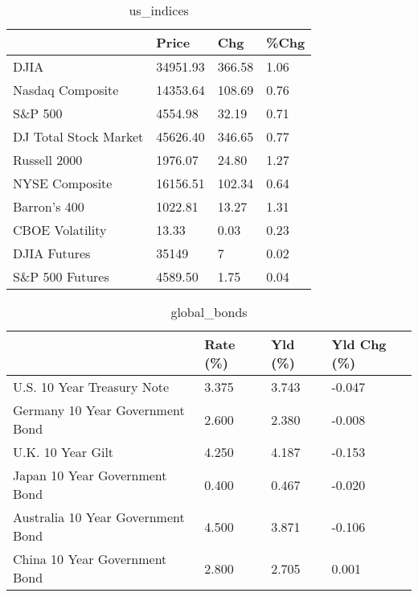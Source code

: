 \documentclass{article}%
\begin{document}
%


\begin{table}[htbp]%
\caption{us\_indices}%
\centering%
\begin{adjustbox}{width=1\textwidth}%
\begin{tabular}{llll}
\toprule
                      &    Price &    Chg & \%Chg \\
\midrule
                 DJIA & 34951.93 & 366.58 & 1.06 \\
     Nasdaq Composite & 14353.64 & 108.69 & 0.76 \\
              S\&P 500 &  4554.98 &  32.19 & 0.71 \\
DJ Total Stock Market & 45626.40 & 346.65 & 0.77 \\
         Russell 2000 &  1976.07 &  24.80 & 1.27 \\
       NYSE Composite & 16156.51 & 102.34 & 0.64 \\
         Barron's 400 &  1022.81 &  13.27 & 1.31 \\
      CBOE Volatility &    13.33 &   0.03 & 0.23 \\
         DJIA Futures &    35149 &      7 & 0.02 \\
      S\&P 500 Futures &  4589.50 &   1.75 & 0.04 \\
\bottomrule
\end{tabular}
%
\end{adjustbox}%
\end{table}

%


\begin{table}[htbp]%
\caption{global\_bonds}%
\centering%
\begin{adjustbox}{width=1\textwidth}%
\begin{tabular}{llll}
\toprule
                                  & Rate (\%) & Yld (\%) & Yld Chg (\%) \\
\midrule
       U.S. 10 Year Treasury Note &    3.375 &   3.743 &      -0.047 \\
  Germany 10 Year Government Bond &    2.600 &   2.380 &      -0.008 \\
                U.K. 10 Year Gilt &    4.250 &   4.187 &      -0.153 \\
    Japan 10 Year Government Bond &    0.400 &   0.467 &      -0.020 \\
Australia 10 Year Government Bond &    4.500 &   3.871 &      -0.106 \\
    China 10 Year Government Bond &    2.800 &   2.705 &       0.001 \\
\bottomrule
\end{tabular}
%
\end{adjustbox}%
\end{table}
\end{document}
